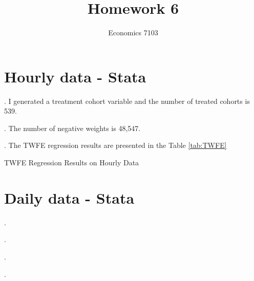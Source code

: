 \documentclass{article}
\title{Homework 6}
\author{Economics 7103}
\begin{document}
  
\maketitle

\section{Hourly data - Stata}
. I generated a treatment cohort variable and the number of treated cohorts is 539.

. The number of negative weights is  48,547.

. The TWFE regression results are presented in the Table \ref{tab:TWFE}

\begin{table}[h]
    \centering
    
    \caption{TWFE Regression Results on Hourly Data}
    \label{tab:TWFE}
\end{table}

\section{Daily data - Stata}

. 

.

. 

.
\end{document}
